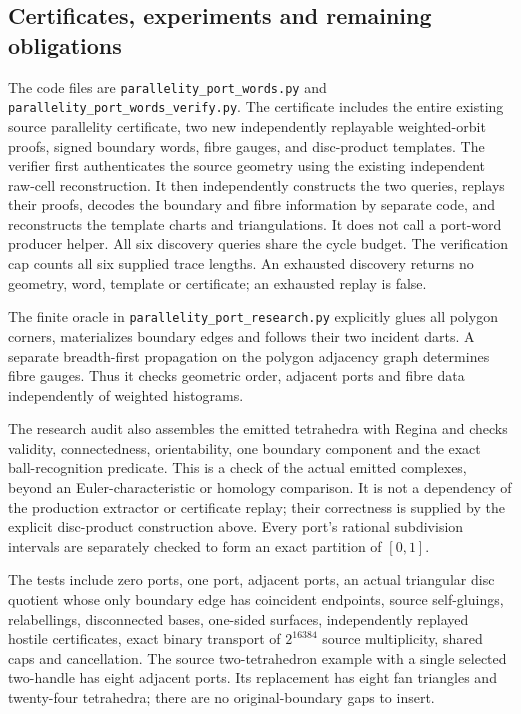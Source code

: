 \subsection{Certificates, experiments and remaining obligations}

The code files are \texttt{parallelity\_port\_words.py} and
\texttt{parallelity\_port\_words\_verify.py}.  The certificate includes the
entire existing source parallelity certificate, two new independently
replayable weighted-orbit proofs, signed boundary words, fibre gauges, and
disc-product templates.  The verifier first authenticates the source
geometry using the existing independent raw-cell reconstruction.  It then
independently constructs the two queries, replays their proofs, decodes the
boundary and fibre information by separate code, and reconstructs the
template charts and triangulations.  It does not call a port-word producer
helper.  All six discovery queries share the cycle budget.  The verification
cap counts all six supplied trace lengths.  An exhausted discovery returns
no geometry, word, template or certificate; an exhausted replay is false.

The finite oracle in \texttt{parallelity\_port\_research.py} explicitly
glues all polygon corners, materializes boundary edges and follows their
two incident darts.  A separate breadth-first propagation on the polygon
adjacency graph determines fibre gauges.  Thus it checks geometric order,
adjacent ports and fibre data independently of weighted histograms.

The research audit also assembles the emitted tetrahedra with Regina and
checks validity, connectedness, orientability, one boundary component and
the exact ball-recognition predicate.  This is a check of the actual emitted
complexes, beyond an Euler-characteristic or homology comparison.  It is not
a dependency of the production extractor or certificate replay; their
correctness is supplied by the explicit disc-product construction above.
Every port's rational subdivision intervals are separately checked to form
an exact partition of $[0,1]$.

The tests include zero ports, one port, adjacent ports, an actual triangular
disc quotient whose only boundary edge has coincident endpoints, source
self-gluings, relabellings, disconnected bases, one-sided surfaces,
independently replayed hostile certificates, exact binary transport of
$2^{16384}$ source multiplicity, shared caps and cancellation.  The source
two-tetrahedron example with a single selected two-handle has eight adjacent
ports.  Its replacement has eight fan triangles and twenty-four tetrahedra;
there are no original-boundary gaps to insert.

